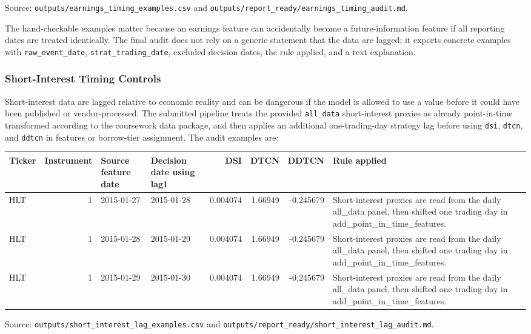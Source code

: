 \documentclass[
]{article}
\begin{document}
Source: \texttt{outputs/earnings\_timing\_examples.csv} and
\texttt{outputs/report\_ready/earnings\_timing\_audit.md}.

The hand-checkable examples matter because an earnings feature can
accidentally become a future-information feature if all reporting dates
are treated identically. The final audit does not rely on a generic
statement that the data are lagged; it exports concrete examples with
\texttt{raw\_event\_date}, \texttt{strat\_trading\_date}, excluded
decision dates, the rule applied, and a text explanation.

\hypertarget{short-interest-timing-controls}{%
\subsubsection{Short-Interest Timing
Controls}\label{short-interest-timing-controls}}

Short-interest data are lagged relative to economic reality and can be
dangerous if the model is allowed to use a value before it could have
been published or vendor-processed. The submitted pipeline treats the
provided \texttt{all\_data} short-interest proxies as already
point-in-time transformed according to the coursework data package, and
then applies an additional one-trading-day strategy lag before using
\texttt{dsi}, \texttt{dtcn}, and \texttt{ddtcn} in features or
borrow-tier assignment. The audit examples are:

\begin{longtable}[]{@{}lrllrrrl@{}}
\toprule
Ticker & Instrument & Source feature date & Decision date using lag1 &
DSI & DTCN & DDTCN & Rule applied \\
\midrule
\endhead
HLT & 1 & 2015-01-27 & 2015-01-28 & 0.004074 & 1.66949 & -0.245679 &
Short-interest proxies are read from the daily all\_data panel, then
shifted one trading day in add\_point\_in\_time\_features. \\
HLT & 1 & 2015-01-28 & 2015-01-29 & 0.004074 & 1.66949 & -0.245679 &
Short-interest proxies are read from the daily all\_data panel, then
shifted one trading day in add\_point\_in\_time\_features. \\
HLT & 1 & 2015-01-29 & 2015-01-30 & 0.004074 & 1.66949 & -0.245679 &
Short-interest proxies are read from the daily all\_data panel, then
shifted one trading day in add\_point\_in\_time\_features. \\
\bottomrule
\end{longtable}

Source: \texttt{outputs/short\_interest\_lag\_examples.csv} and
\texttt{outputs/report\_ready/short\_interest\_lag\_audit.md}.
\end{document}
